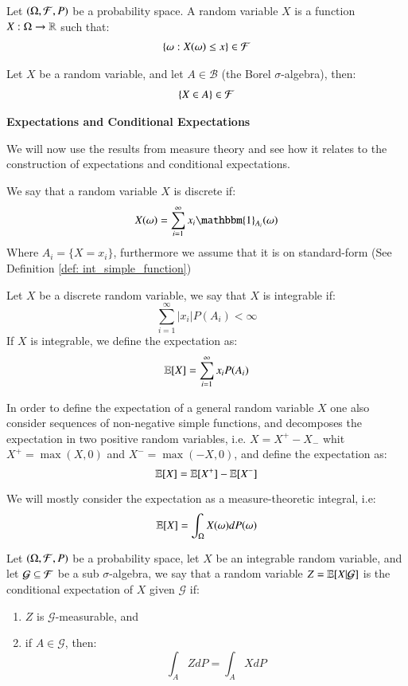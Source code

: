 \begin{definition}
Let $(\Omega, \mathcal{F}, P)$ be a probability space. A random variable $X$ is a function $X:\Omega \to \mathbb{R}$ such that: 
\begin{align*}
\{\omega: X(\omega) \leq x\} \in \mathcal{F}   
\end{align*}
\end{definition}

\begin{proposition}
Let $X$ be a random variable, and let $A \in \mathcal{B}$ (the Borel $\sigma$-algebra), then: 
\begin{align*}
\{X \in A\} \in \mathcal{F}    
\end{align*}
\end{proposition}

\centerline{\textbf{Expectations and Conditional Expectations}}
We will now use the results from measure theory and see how it relates to the construction of expectations and conditional expectations. 

\begin{definition}
We say that a random variable $X$ is discrete if: 
\[
X(\omega) = \sum_{i=1}^{\infty}x_{i}\mathbbm{1}_{A_{i}}(\omega)
\]
Where $A_{i} = \{X = x_{i}\}$, furthermore we assume that it is on standard-form (See Definition \ref{def: int_simple_function})
\end{definition}

\begin{definition}
Let $X$ be a discrete random variable, we say that $X$ is integrable if:
\[
\sum_{i=1}^{\infty}|x_{i}|P(A_{i}) < \infty
\]
If $X$ is integrable, we define the expectation as:
\[
\mathbb{E}[X] = \sum_{i=1}^{\infty}x_{i}P(A_{i})
\]
\end{definition}

In order to define the expectation of a general random variable $X$ one also consider sequences of non-negative simple functions, and decomposes the expectation in two positive random variables, i.e. $X = X^{+} - X_{-}$ whit $X^{+} = \max(X,0)$ and $X^{-} = \max(-X,0)$, and define the expectation as: 
\[
\mathbb{E}[X] = \mathbb{E}[X^{+}] - \mathbb{E}[X^{-}]
\]

We will mostly consider the expectation as a measure-theoretic integral, i.e: 
\[
\mathbb{E}[X] = \int_{\Omega}X(\omega)dP(\omega)
\]


\begin{definition}
Let $(\Omega, \mathcal{F}, P)$ be a probability space, let $X$ be an integrable random variable, and let $\mathcal{G} \subseteq \mathcal{F}$ be a sub $\sigma$-algebra, we say that a random variable $Z = \mathbb{E}[X|\mathcal{G}]$ is the conditional expectation of $X$ given $\mathcal{G}$ if: 
\begin{enumerate}[label= (\roman*), , leftmargin=*]
    \item $Z$ is $\mathcal{G}$-measurable, and
    \item if $A\in \mathcal{G}$, then:
    \[
    \int_{A}ZdP = \int_{A}XdP
    \]
\end{enumerate}
\end{definition}

